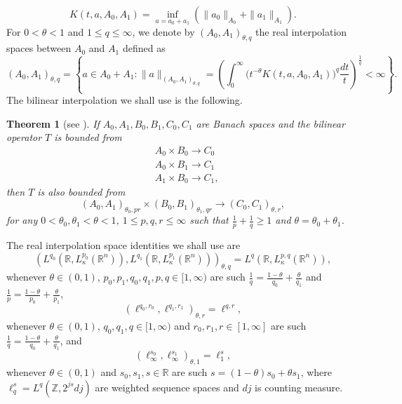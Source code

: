 \documentclass[a4paper,11pt, reqno]{amsart}
\numberwithin{equation}{section}
\theoremstyle{plain}
\newtheorem{theorem}{Theorem}[section]
\theoremstyle{definition}
\theoremstyle{remark}
\begin{document}
\begin{equation*}
K(t,a,A_0,A_1)=\inf_{a=a_0+a_1}\left(\|a_0\|_{A_0}+\|a_1\|_{A_1}\right).
\end{equation*}For $0<\theta<1$ and $1\leq q\leq \infty$, we denote by $(A_0,A_1)_{\theta,q}$ the real interpolation spaces between $A_0$ and $A_1$ defined as
\begin{equation*}
    (A_0,A_1)_{\theta,q}=\left\{a\in A_0+A_1: \|a\|_{(A_0,A_1)_{\theta,q}}=\left(\int_0^\infty \Big(t^{-\theta}K(t,a,A_0,A_1)\Big)^q\frac{dt}{t}\right)^\frac{1}{q}<\infty\right\}.
\end{equation*}
The bilinear interpolation we shall use is the following.
\begin{theorem}[see \cite{Bergh-Lofstrom}]\label{bilinear-argument} If $A_0,A_1,B_0,B_1,C_0,C_1$ are Banach spaces and the bilinear operator $T$ is bounded from 
\begin{align*}
    &A_0\times B_0\rightarrow C_0\\
    &A_0\times B_1\rightarrow C_1\\
    &A_1\times B_0\rightarrow C_1,
\end{align*}
then $T$ is also bounded from
\begin{equation*}
(A_0,A_1)_{\theta_0,pr}\times (B_0,B_1)_{\theta_1,qr}\rightarrow (C_0,C_1)_{\theta,r},
\end{equation*}
for any $0<\theta_0,\theta_1<\theta<1$, $1\leq p,q,r\leq\infty$ such that $\frac{1}{p}+\frac{1}{q}\geq 1$ and $\theta=\theta_0+\theta_1$.
\end{theorem}
The real interpolation space identities we shall use are
\begin{equation}\label{L-qp}
    \left(L^{q_0}(\mathbb{R},L_\kappa^{p_0}(\mathbb{R}^n)),L^{q_1}(\mathbb{R},L_\kappa^{p_1}(\mathbb{R}^n))\right)_{\theta,q}=L^{q}(\mathbb{R},L_\kappa^{p,q}(\mathbb{R}^n)),
\end{equation}
whenever $\theta\in (0,1)$, $p_0,p_1,q_0,q_1,p,q\in [1,\infty)$ are such $\frac{1}{q}=\frac{1-\theta}{q_0}+\frac{\theta}{q_1}$ and $\frac{1}{p}=\frac{1-\theta}{p_0}+\frac{\theta}{p_1}$, 
\begin{equation}\label{l-qp}
    \left(\ell^{q_0,r_0},\ell^{q_1,r_1}\right)_{\theta,r}=\ell^{q,r},
\end{equation}
whenever $\theta\in (0,1)$, $q_0,q_1,q\in [1,\infty)$ and $r_0,r_1,r\in[1,\infty]$ are such $\frac{1}{q}=\frac{1-\theta}{q_0}+\frac{\theta}{q_1}$, and
\begin{equation}\label{l-infty-s}
\left(\ell_\infty^{s_0},\ell_\infty^{s_1}\right)_{\theta,1}=\ell^s_1,
\end{equation}
whenever $\theta\in (0,1)$ and $s_0,s_1,s\in\mathbb{R}$ are such $s=(1-\theta)s_0+\theta s_1$, where $\ell_q^s=L^q(\mathbb{Z}, 2^{js}dj)$ are weighted sequence spaces and $dj$ is counting measure.
\end{document}
